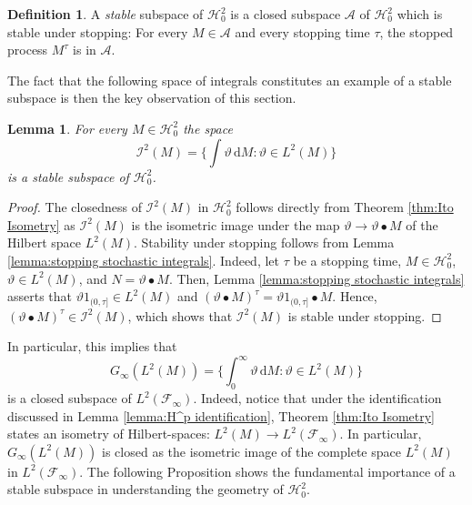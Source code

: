 \documentclass[11pt,a4paper,twoside,openany]{report}
\numberwithin{equation}{section}
\newcommand{\diff}{\mathrm{d}}
\theoremstyle{plain} %
\newtheorem{lemma}[theorem]{Lemma}
\theoremstyle{definition} %
\newtheorem{definition}[theorem]{Definition}
\theoremstyle{remark} %
\begin{document}
\begin{definition}\label{def:stable subspace}
    A \textit{stable} subspace of \(\mathcal{H}_0^2\) is a closed subspace \(\mathcal{A}\) of \(\mathcal{H}_0^2\) which is stable under stopping: For every \(M\in\mathcal{A}\) and every stopping time \(\tau\), the stopped process \(M^{\tau}\) is in \(\mathcal{A}\).
\end{definition}
The fact that the following space of integrals constitutes an example of a stable subspace is then the key observation of this section.
\begin{lemma}\label{lemma:stochastic integrals as stable subspace}
    For every \(M\in\mathcal{H}_{0}^2\) the space 
    \begin{equation*}
        \mathcal{I}^2(M)=\{\int \vartheta\,\diff M:\vartheta\in L^2(M)\}
    \end{equation*}
    is a stable subspace of \(\mathcal{H}_0^2\). 
\end{lemma}
\begin{proof}
    The closedness of \( \mathcal{I}^2(M)\) in \(\mathcal{H}^2_0\) follows directly from Theorem \ref{thm:Ito Isometry} as \( \mathcal{I}^2(M)\) is the isometric image under the map \(\vartheta\to \vartheta\bullet M\) of the Hilbert space \(L^2(M)\). Stability under stopping follows from Lemma \ref{lemma:stopping stochastic integrals}. Indeed, let \(\tau\) be a stopping time, \(M\in\mathcal{H}^2_0\), \(\vartheta\in L^2(M)\), and \(N=\vartheta\bullet M\). Then, Lemma \ref{lemma:stopping stochastic integrals} asserts that \(\vartheta1_{(0,\tau]}\in L^2(M)\) and \((\vartheta\bullet M)^{\tau}=\vartheta1_{(0,\tau]}\bullet M\).  Hence, \((\vartheta\bullet M)^{\tau}\in \mathcal{I}^2(M)\), which shows that \(\mathcal{I}^2(M)\) is stable under stopping. 
\end{proof}
In particular, this implies that  
\begin{equation}\label{eq:closedness of vartheta bullet M_T in L^2}
     G_{\infty}(L^2(M))=\{\int_0^{\infty} \vartheta\,\diff M:\vartheta\in L^2(M)\}
\end{equation}
is a closed subspace of \(L^2(\mathcal{F}_{\infty})\). Indeed, notice that under the identification discussed in Lemma \ref{lemma:H^p identification},
Theorem \ref{thm:Ito Isometry} states an isometry of Hilbert-spaces: \(L^2(M)\to L^2(\mathcal{F}_{\infty})\). In particular, \(G_{\infty}(L^2(M))\) is closed as the isometric image of the complete space \(L^2(M)\) in \(L^2(\mathcal{F}_{\infty})\). The following Proposition shows the fundamental importance of a stable subspace in understanding the geometry of \(\mathcal{H}_0^2\). 
\end{document}
